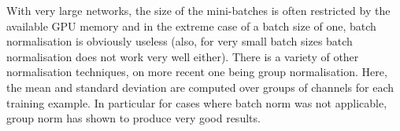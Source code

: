 With very large networks, the size of the mini-batches is often restricted by
the available GPU memory and in the extreme case of a batch size of one, batch
normalisation is obviously useless (also, for very small batch sizes batch
normalisation does not work very well either). There is a variety of other
normalisation techniques, on more recent one being group normalisation. Here,
the mean and standard deviation are computed over groups of channels for each
training example. In particular for cases where batch norm was not applicable,
group norm has shown to produce very good results.


